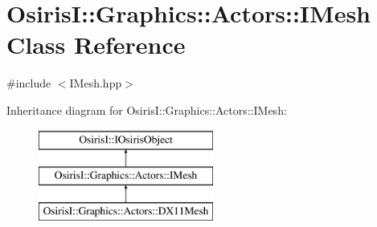 \hypertarget{class_osiris_i_1_1_graphics_1_1_actors_1_1_i_mesh}{\section{Osiris\-I\-:\-:Graphics\-:\-:Actors\-:\-:I\-Mesh Class Reference}
\label{class_osiris_i_1_1_graphics_1_1_actors_1_1_i_mesh}
}


{\ttfamily \#include $<$I\-Mesh.\-hpp$>$}

Inheritance diagram for Osiris\-I\-:\-:Graphics\-:\-:Actors\-:\-:I\-Mesh\-:\begin{figure}[H]
\begin{center}
\leavevmode
\includegraphics[height=3.000000cm]{class_osiris_i_1_1_graphics_1_1_actors_1_1_i_mesh}
\end{center}
\end{figure}
